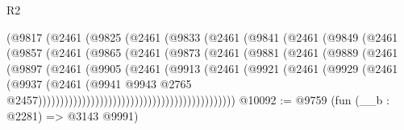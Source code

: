 \begin{lexlean}{R2}
\begin{coremodule}
                            (@9817
                              (@2461
                                (@9825
                                  (@2461
                                    (@9833
                                      (@2461
                                        (@9841
                                          (@2461
                                            (@9849
                                              (@2461
                                                (@9857
                                                  (@2461
                                                    (@9865
                                                      (@2461
                                                        (@9873
                                                          (@2461
                                                            (@9881
                                                              (@2461
                                                                (@9889
                                                                  (@2461
                                                                    (@9897
                                                                      (@2461
                                                                        (@9905
                                                                          (@2461
                                                                            (@9913
                                                                              (@2461
                                                                                (@9921
                                                                                  (@2461
                                                                                    (@9929
                                                                                      (@2461
                                                                                        (@9937
                                                                                          (@2461
                                                                                            (@9941
                                                                                              @9943
                                                                                              @2765
                                                                                              @2457)))))))))))))))))))))))))))))))))))))))))))))
@10092 := @9759
    (fun (__b : @2281) => @3143 @9991)

\end{coremodule}
\end{lexlean}
